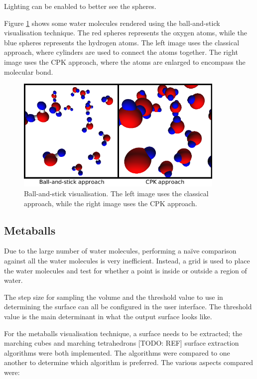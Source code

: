 Lighting can be enabled to better see the spheres.

Figure \ref{fig:implementation_ballstick} shows some water molecules rendered
using the ball-and-stick visualisation technique. The red spheres represents
the oxygen atoms, while the blue spheres represents the hydrogen atoms. The
left image uses the classical approach, where cylinders are used to connect the
atoms together. The right image uses the CPK approach, where the atoms are
enlarged to encompass the molecular bond.

\begin{figure}
  \begin{center}
    \includegraphics[width=100mm]{ballstick}
  \end{center}
  \caption{Ball-and-stick visualisation. The left image uses the classical
  approach, while the right image uses the CPK approach.}
  \label{fig:implementation_ballstick}
\end{figure}


\subsection{Metaballs}
\label{sub:implementation_metaballs}

Due to the large number of water molecules, performing a na\"ive comparison
against all the water molecules is very inefficient. Instead, a grid is used to
place the water molecules and test for whether a point is inside or outside a
region of water.

The step size for sampling the volume and the threshold value to use in
determining the surface can all be configured in the user interface. The
threshold value is the main determinant in what the output surface looks like.


For the metaballs visualisation technique, a surface needs to be extracted; the
marching cubes and marching tetrahedrons [TODO: REF] surface extraction
algorithms were both implemented. The algorithms were compared to one another
to determine which algorithm is preferred. The various aspects compared were:


